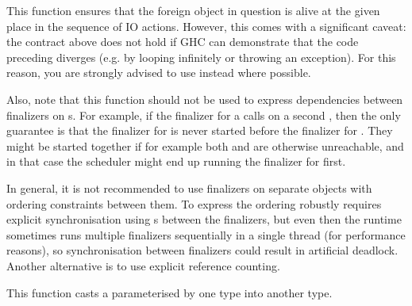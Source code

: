 \begin{haddockdesc}
\item[\begin{tabular}{@{}l}
touchForeignPtr :: ForeignPtr a -> IO ()
\end{tabular}]
{\haddockbegindoc
This function ensures that the foreign object in
 question is alive at the given place in the sequence of IO
 actions. However, this comes with a significant caveat: the contract above
 does not hold if GHC can demonstrate that the code preceding
  diverges (e.g. by looping infinitely or throwing an
 exception). For this reason, you are strongly advised to use instead
  where possible.\par
Also, note that this function should not be used to express dependencies
 between finalizers on s.  For example, if the finalizer for a
   calls  on a second  ,
 then the only guarantee is that the finalizer for  is never started
 before the finalizer for .  They might be started together if for
 example both  and  are otherwise unreachable, and in that case the
 scheduler might end up running the finalizer for  first.\par
In general, it is not recommended to use finalizers on separate
 objects with ordering constraints between them.  To express the
 ordering robustly requires explicit synchronisation using s
 between the finalizers, but even then the runtime sometimes runs
 multiple finalizers sequentially in a single thread (for
 performance reasons), so synchronisation between finalizers could
 result in artificial deadlock.  Another alternative is to use
 explicit reference counting.\par}
\end{haddockdesc}
\begin{haddockdesc}
\item[\begin{tabular}{@{}l}
castForeignPtr :: ForeignPtr a -> ForeignPtr b
\end{tabular}]
{\haddockbegindoc
This function casts a 
 parameterised by one type into another type.\par}
\end{haddockdesc}

